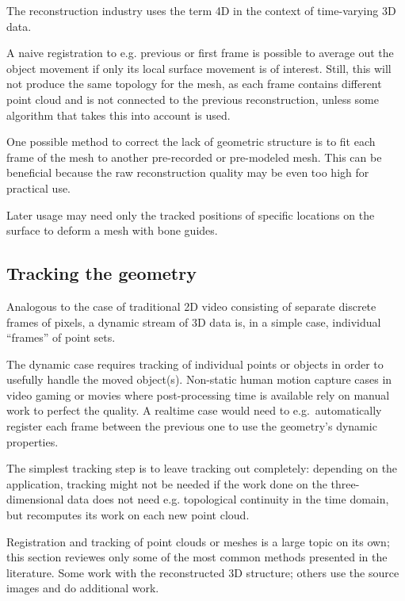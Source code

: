 The reconstruction industry uses the term 4D in the context of time-varying 3D data.

A naive registration to e.g. previous or first frame is possible to average out the object movement if only its local surface movement is of interest.
Still, this will not produce the same topology for the mesh, as each frame contains different point cloud and is not connected to the previous reconstruction, unless some algorithm that takes this into account is used.

One possible method to correct the lack of geometric structure is to fit each frame of the mesh to another pre-recorded or pre-modeled mesh. \cite{somewhere,remedysoftware?}
This can be beneficial because the raw reconstruction quality may be even too high for practical use.

Later usage may need only the tracked positions of specific locations on the surface to deform a mesh with bone guides.


\subsection{Tracking the geometry} %




Analogous to the case of traditional 2D video consisting of separate discrete frames of pixels, a dynamic stream of 3D data is, in a simple case, individual ``frames'' of point sets.

The dynamic case requires tracking of individual points or objects in order to usefully handle the moved object(s).
Non-static human motion capture cases in video gaming or movies where post-processing time is available rely on manual work to perfect the quality.
A realtime case would need to e.g.~automatically register each frame between the previous one to use the geometry's dynamic properties.

The simplest tracking step is to leave tracking out completely: depending on the application, tracking might not be needed if the work done on the three-dimensional data does not need e.g. topological continuity in the time domain, but recomputes its work on each new point cloud.

Registration and tracking of point clouds or meshes is a large topic on its own; this section reviewes only some of the most common methods presented in the literature. Some work with the reconstructed 3D structure; others use the source images and do additional work.

